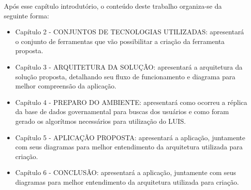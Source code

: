 Após esse capítulo introdutório, o conteúdo deste trabalho organiza-se da seguinte forma:
	\begin{itemize}
		\item{Capítulo 2 - \uppercase{Conjuntos de tecnologias utilizadas}: apresentará o conjunto de ferramentas que vão possibilitar a criação da ferramenta proposta.}
		\item{Capítulo 3 - \uppercase{Arquitetura da solução}: apresentará a arquitetura da solução proposta, detalhando seu fluxo de funcionamento e diagrama para melhor compreensão da aplicação.}
		\item{Capítulo 4 - \uppercase{Preparo do ambiente}: apresentará como ocorreu a réplica da base de dados governamental para buscas dos usuários e como foram gerado os algorítmos necessários para utilização do LUIS.}
		\item{Capítulo 5 - \uppercase{Aplicação proposta}: apresentará a aplicação, juntamente com seus diagramas para melhor entendimento da arquitetura utilizada para criação.}
		\item{Capítulo 6 - \uppercase{Conclusão}: apresentará a aplicação, juntamente com seus diagramas para melhor entendimento da arquitetura utilizada para criação.}
	\end{itemize}
